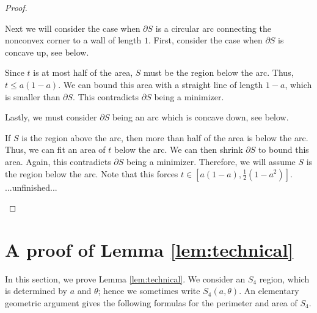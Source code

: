 \documentclass[leqno]{article}
\numberwithin{equation}{section}
\theoremstyle{definition}
\theoremstyle{remark}
\theoremstyle{plain}
\begin{document}
{\begin{proof}
\begin{enumerate}
        Next we will consider the case when $\partial S$ is a circular arc connecting the nonconvex corner to a wall of length $1$. First, consider the case when $\partial S$ is concave up, see below.

        \begin{center}
        \end{center}

        Since $t$ is at most half of the area, $S$ must be the region below the arc. Thus, $t \leq a(1-a)$. We can bound this area with a straight line of length $1-a$, which is smaller than $\partial S$. This contradicts $\partial S$ being a minimizer.

        Lastly, we must consider $\partial S$ being an arc which is concave down, see below.

        \begin{center}
        \end{center}

        If $S$ is the region above the arc, then more than half of the area is below the arc. Thus, we can fit an area of $t$ below the arc. We can then shrink $\partial S$ to bound this area. Again, this contradicts $\partial S$ being a minimizer. Therefore, we will assume $S$ is the region below the arc. Note that this forces $t \in \left[a(1-a),\frac{1}{2}(1-a^2)\right]$. ...unfinished...
    \end{enumerate}
\end{proof}

}

\fi


\section{A proof of Lemma \ref{lem:technical}}\label{sec:IV} In this section, we prove Lemma \ref{lem:technical}. We consider an $S_4$ region, which is determined by $a$ and $\theta$; hence we sometimes write $S_4(a,\theta)$. An elementary geometric argument gives the following formulas for the perimeter and area of $S_4$.
\end{document}
